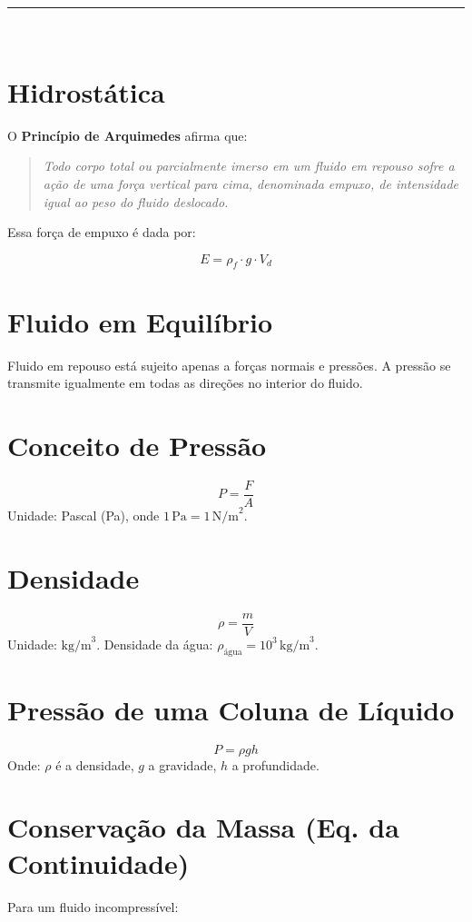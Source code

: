 \documentclass[a4paper,12pt]{article}
\begin{document}
\begin{multicols}{2}
\noindent\rule{\linewidth}{1pt}\\
\section{Hidrostática}

O \textbf{Princípio de Arquimedes} afirma que:

\begin{quote}
    \textit{Todo corpo total ou parcialmente imerso em um fluido em repouso sofre a ação de uma 
    força vertical para cima, denominada empuxo, de intensidade igual ao peso do fluido deslocado.}
\end{quote}

Essa força de empuxo é dada por:

\[
\boxed{
E = \rho_f \cdot g \cdot V_d
}
\]

\section{Fluido em Equilíbrio}
Fluido em repouso está sujeito apenas a forças normais e pressões. A pressão se transmite igualmente em todas as direções no interior do fluido.

\section{Conceito de Pressão}
\[
P = \frac{F}{A}
\]
Unidade: Pascal (Pa), onde \(1\, \text{Pa} = 1\, \text{N/m}^2\).

\section{Densidade}
\[
\rho = \frac{m}{V}
\]
Unidade: \(\text{kg/m}^3\). Densidade da água: \(\rho_{\text{água}} = 10^3\, \text{kg/m}^3\).

\section{Pressão de uma Coluna de Líquido}
\[
P = \rho g h
\]
Onde: \(\rho\) é a densidade, \(g\) a gravidade, \(h\) a profundidade.

\section{Conservação da Massa (Eq. da Continuidade)}

Para um fluido incompressível:


\end{multicols}
\end{document}
